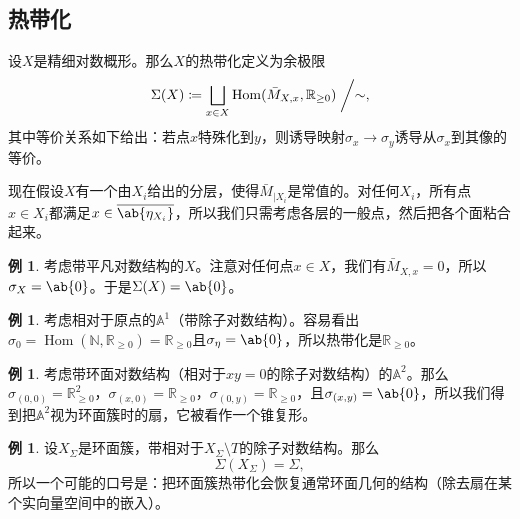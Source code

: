 \documentclass{amsart}
\theoremstyle{definition}
\newtheorem{exm}[thm]{例}
\theoremstyle{remark}
\theoremstyle{plain}
\theoremstyle{definition}
\theoremstyle{remark}
\newcommand{\A}{\mathbb{A}}
\newcommand{\N}{\mathbb{N}}
\newcommand{\R}{\mathbb{R}}
\newcommand{\ol}[1]{\overline{#1}}
\newcommand{\1}{\mathbf{1}}
\newcommand{\2}{\mathbf{2}}
\newcommand{\3}{\mathbf{3}}
\DeclareMathOperator{\Hom}{Hom}
\begin{document}
\subsection{热带化}%
\label{sub:Tropicalization}

设\(X\)是精细对数概形。那么\(X\)的热带化定义为余极限
\[\Sigma(X) \coloneqq \bigsqcup_{x \in X} \Hom(\bar{M}_{X,x}, \R_{\geq 0}) \biggm/ \sim, \]
其中等价关系如下给出：若点\(x\)特殊化到\(y\)，则诱导映射\(\sigma_x \to \sigma_y\)诱导从\(\sigma_x\)到其像的等价。

现在假设\(X\)有一个由\(X_i\)给出的分层，使得\(\bar{M}_{|X_i}\)是常值的。对任何\(X_i\)，所有点\(x \in X_i\)都满足\(x \in \ol{\ab\{\eta_{X_i}\}}\)，所以我们只需考虑各层的一般点，然后把各个面粘合起来。

\begin{exm}
    考虑带平凡对数结构的\(X\)。注意对任何点\(x \in X\)，我们有\(\bar{M}_{X,x} = 0\)，所以\(\sigma_X = \ab\{0\}\)。于是\(\Sigma(X) = \ab\{0\}\)。
\end{exm}

\begin{exm}
    考虑相对于原点的\(\A^1\)（带除子对数结构）。容易看出\(\sigma_0 = \Hom(\N, \R_{\geq 0}) = \R_{\geq 0}\)且\(\sigma_{\eta} = \ab\{0\}\)，所以热带化是\(\R_{\geq 0}\)。
\end{exm}

\begin{exm}
    考虑带环面对数结构（相对于\(xy = 0\)的除子对数结构）的\(\A^2\)。那么\(\sigma_{(0,0)} = \R^2_{\geq 0}\)，\(\sigma_{(x,0)} = \R_{\geq 0}\)，\(\sigma_{(0,y)} = \R_{\geq 0}\)，且\(\sigma_{(x,y)} = \ab\{0\}\)，所以我们得到把\(\A^2\)视为环面簇时的扇，它被看作一个锥复形。
\end{exm}

\begin{exm}
    设\(X_{\Sigma}\)是环面簇，带相对于\(X_{\Sigma} \setminus T\)的除子对数结构。那么
    \[ \Sigma(X_{\Sigma}) = \Sigma, \]
    所以一个可能的口号是：把环面簇热带化会恢复通常环面几何的结构（除去扇在某个实向量空间中的嵌入）。
\end{exm}
\end{document}
